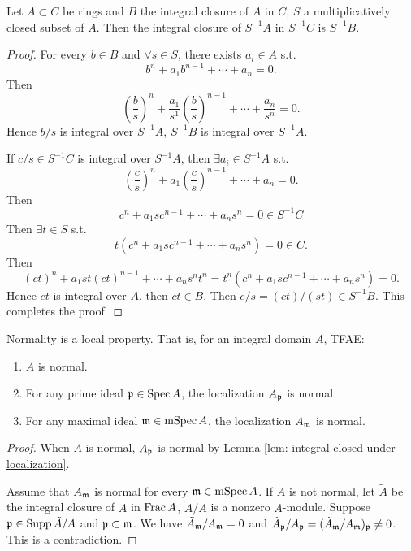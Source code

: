     \begin{lemma}\label{lem: integral closed under localization}
        Let $A \subset C$ be rings and $B$ the integral closure of $A$ in $C$, $S$ a multiplicatively closed subset of $A$.
        Then the integral closure of  $S^{-1}A$ in $S^{-1}C$ is $S^{-1}B$.
    \end{lemma}
    \begin{proof}
            For every $b \in B$ and $\forall s \in S$, there exists $a_i \in A$ s.t. 
            \[ 
                b^n + a_1 b^{n-1} + \cdots + a_n = 0.
            \] 
            Then 
            \[ 
                \left( \frac{b}{s} \right)^n + \frac{a_1}{s^1} \left( \frac{b}{s} \right)^{n-1} + \cdots + \frac{a_n}{s^n} = 0.
            \] 
            Hence $b/s$ is integral over $S^{-1}A$, $S^{-1}B$ is integral over $S^{-1}A$.

            If $c/s \in S^{-1}C$ is integral over $S^{-1}A$, then $\exists a_i \in S^{-1}A$ s.t.
            \[ 
                \left( \frac{c}{s} \right)^n + a_1 \left( \frac{c}{s} \right)^{n-1} + \cdots + a_n = 0.
            \]
            Then 
            \[ 
                c^n + a_1 s c^{n-1} + \cdots + a_n s^n = 0 \in S^{-1}C
            \] 
            Then $\exists t \in S$ s.t. 
            \[
                t (c^n + a_1 s c^{n-1} + \cdots + a_n s^n) = 0 \in C.
            \] 
            Then 
            \[ 
                (ct)^n + a_1 s t (ct)^{n-1} + \cdots + a_n s^n t^n  = t^n (c^n + a_1 s c^{n-1} + \cdots + a_n s^n) = 0.
            \] 
            Hence $ct$ is integral over $A$, then $ct \in B$.
            Then $c/s = (ct)/(st) \in S^{-1}B$.
            This completes the proof.
    \end{proof}

    \begin{proposition}\label{prop: normality is a local property}
        Normality is a local property. 
        That is, for an integral domain $A$, TFAE:
        \begin{enumerate}[label=(\roman*)]
            \item $A$ is normal.
            \item For any prime ideal ${\mathfrak{p}} \in \operatorname{Spec} A$, the localization $A_{\mathfrak{p}}$ is normal.
            \item For any maximal ideal ${\mathfrak{m}} \in \operatorname{mSpec} A$, the localization $A_{\mathfrak{m}}$ is normal.
        \end{enumerate}
    \end{proposition}
    \begin{proof}
        When $A$ is normal, $A_{\mathfrak{p}}$ is normal by Lemma \ref{lem: integral closed under localization}.

        Assume that $A_{\mathfrak{m}}$ is normal for every ${\mathfrak{m}} \in \operatorname{mSpec} A$.
        If $A$ is not normal, let $\tilde{A}$ be the integral closure of $A$ in $\operatorname{Frac} A$, $\tilde{A}/A$ is a nonzero $A$-module.
        Suppose ${\mathfrak{p}} \in \operatorname{Supp} \tilde{A}/A$ and ${\mathfrak{p}} \subset {\mathfrak{m}}$.
        We have $\tilde{A}_{\mathfrak{m}}/A_{\mathfrak{m}} = 0$ and $\tilde{A}_{\mathfrak{p}}/A_{\mathfrak{p}} = (\tilde{A}_{\mathfrak{m}}/A_{\mathfrak{m}})_{\mathfrak{p}} \neq 0$.
        This is a contradiction.
    \end{proof}

